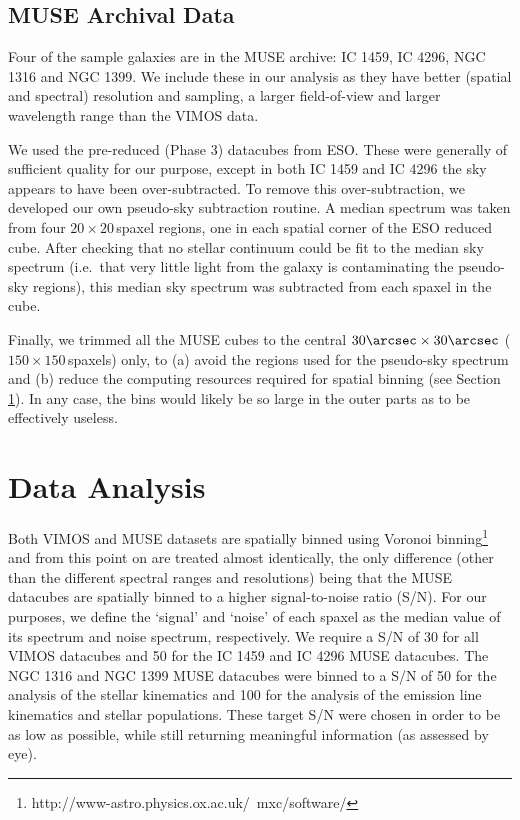 \documentclass[a4paper,fleqn,usenatbib]{mnras}
\begin{document}
	\subsection{MUSE Archival Data}
		\label{subsec:MUSE}
		Four of the sample galaxies are in the MUSE archive: IC 1459, IC 4296, NGC 1316 and NGC 1399. We include these in our analysis as they have better (spatial and spectral) resolution and sampling, a larger field-of-view and larger wavelength range than the VIMOS data. 

		We used the pre-reduced (Phase 3) datacubes from ESO. These were generally of sufficient quality for our purpose, except in both IC 1459 and IC 4296 the sky appears to have been over-subtracted. To remove this over-subtraction, we developed our own pseudo-sky subtraction routine. A median spectrum was taken from four $20 \times 20$\,spaxel regions, one in each spatial corner of the ESO reduced cube. After checking that no stellar continuum could be fit to the median sky spectrum (i.e.\ that very little light from the galaxy is contaminating the pseudo-sky regions), this median sky spectrum was subtracted from each spaxel in the cube. 

		Finally, we trimmed all the MUSE cubes to the central $30\arcsec \times 30\arcsec$ ($150 \times 150$\,spaxels) only, to (a) avoid the regions used for the pseudo-sky spectrum and (b) reduce the computing resources required for spatial binning (see Section \ref{sec:analysis}). In any case, the bins would likely be so large in the outer parts as to be effectively useless.

\section{Data Analysis}
	\label{sec:analysis}
	Both VIMOS and MUSE datasets are spatially binned using Voronoi binning\footnote{http://www-astro.physics.ox.ac.uk/~mxc/software/} \citep{Cappellari2003} and from this point on are treated almost identically, the only difference (other than the different spectral ranges and resolutions) being that the MUSE datacubes are spatially binned to a higher signal-to-noise ratio (S/N). For our purposes, we define the `signal' and `noise' of each spaxel as the median value of its spectrum and noise spectrum, respectively. We require a S/N of 30 for all VIMOS datacubes and 50 for the IC 1459 and IC 4296 MUSE datacubes. The NGC 1316 and NGC 1399 MUSE datacubes were binned to a S/N of 50 for the analysis of the stellar kinematics and 100 for the analysis of the emission line kinematics and stellar populations. These target S/N were chosen in order to be as low as possible, while still returning meaningful information (as assessed by eye). 
\end{document}
